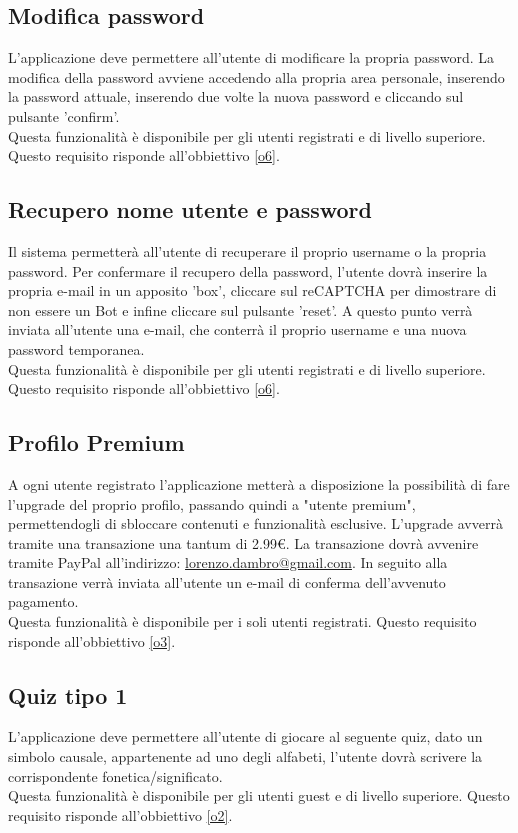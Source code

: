 \subsection{Modifica password} \label{req_modifica_password} 
L'applicazione deve permettere all'utente di modificare la propria password. La modifica della password avviene accedendo alla propria area personale, inserendo la password attuale, inserendo due volte la nuova password e cliccando sul pulsante 'confirm'. \\
Questa funzionalità è disponibile per gli utenti registrati e di livello superiore. Questo requisito risponde all'obbiettivo \ref{o6}. 

\subsection{Recupero nome utente e password} \label{req_recupero_password}
Il sistema permetterà all'utente di recuperare il proprio username o la propria password. Per confermare il recupero della password, l'utente dovrà inserire la propria e-mail in un apposito 'box', cliccare sul reCAPTCHA per dimostrare di non essere un Bot e infine cliccare sul pulsante 'reset'. A questo punto verrà inviata all'utente una e-mail, che conterrà il proprio username e una nuova password temporanea. \\
Questa funzionalità è disponibile per gli utenti registrati e di livello superiore. Questo requisito risponde all'obbiettivo \ref{o6}.

\subsection{Profilo Premium} \label{req_passa_premium}
A ogni utente registrato l'applicazione metterà a disposizione la possibilità di fare l’upgrade del proprio profilo, passando quindi a "utente premium", permettendogli di sbloccare contenuti e funzionalità esclusive. L'upgrade avverrà tramite una transazione una tantum di 2.99\euro. La transazione dovrà avvenire tramite PayPal all’indirizzo: \href{mailto:lorenzo.dambro@gmail.com}{lorenzo.dambro@gmail.com}. In seguito alla transazione verrà inviata all'utente un e-mail di conferma dell'avvenuto pagamento. \\
Questa funzionalità è disponibile per i soli utenti registrati. Questo requisito risponde all'obbiettivo \ref{o3}. 

\subsection{Quiz tipo 1} \label{req_quiz_1}
L'applicazione deve permettere all'utente di giocare al seguente quiz, dato un simbolo causale, appartenente ad uno degli alfabeti, l'utente dovrà scrivere la corrispondente fonetica/significato. \\
Questa funzionalità è disponibile per gli utenti guest e di livello superiore. Questo requisito risponde all'obbiettivo \ref{o2}.

